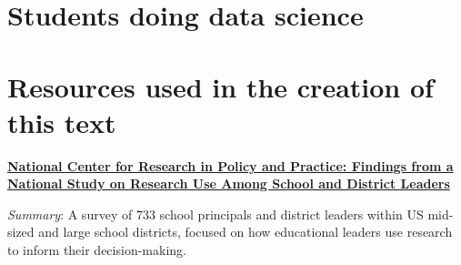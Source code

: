 \documentclass[]{book}
\begin{document}
\chapter{Students doing data science}\label{students-doing-data-science}

\chapter{Resources used in the creation of this
text}\label{resources-used-in-the-creation-of-this-text}

\textbf{\href{http://ncrpp.org/assets/documents/NCRPP_Technical-Report-1_National-Survey-of-Research-Use.pdf}{National
Center for Research in Policy and Practice: Findings from a National
Study on Research Use Among School and District Leaders}}

\emph{Summary}: A survey of 733 school principals and district leaders
within US mid-sized and large school districts, focused on how
educational leaders use research to inform their decision-making.
\end{document}
